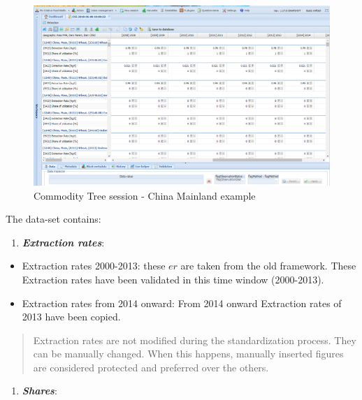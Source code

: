 \documentclass[]{article}
\providecommand{\tightlist}{%
  \setlength{\itemsep}{0pt}\setlength{\parskip}{0pt}}
\begin{document}
\begin{figure}[H]

{\centering \includegraphics[width=0.9\linewidth]{images/commodityTree/05_session} 

}

\caption{\label{fig:f5}Commodity Tree session - China Mainland example}\label{fig:f5}
\end{figure}

The data-set contains:

\begin{enumerate}
\def\labelenumi{\arabic{enumi}.}
\tightlist
\item
  \textbf{\emph{Extraction rates}}:
\end{enumerate}

\begin{itemize}
\tightlist
\item
  Extraction rates 2000-2013: these \(er\) are taken from the old
  framework. These Extraction rates have been validated in this time
  window (2000-2013).
\item
  Extraction rates from 2014 onward: From 2014 onward Extraction rates
  of 2013 have been copied.
\end{itemize}

\begin{quote}
Extraction rates are not modified during the standardization process.
They can be manually changed. When this happens, manually inserted
figures are considered protected and preferred over the others.
\end{quote}

\begin{enumerate}
\def\labelenumi{\arabic{enumi}.}
\setcounter{enumi}{1}
\tightlist
\item
  \textbf{\emph{Shares}}:
\end{enumerate}
\end{document}
